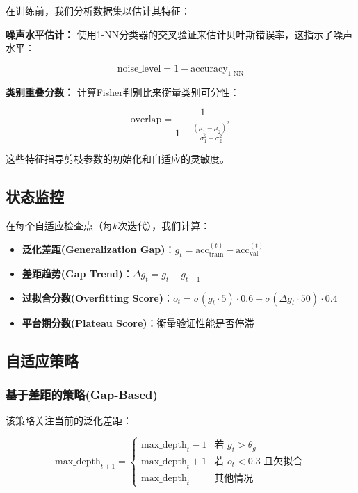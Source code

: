 \documentclass[12pt,a4paper]{article}
\begin{document}
在训练前，我们分析数据集以估计其特征：

\textbf{噪声水平估计：} 使用1-NN分类器的交叉验证来估计贝叶斯错误率，这指示了噪声水平：

\begin{equation}
\text{noise\_level} = 1 - \text{accuracy}_{1\text{-NN}}
\end{equation}

\textbf{类别重叠分数：} 计算Fisher判别比来衡量类别可分性：

\begin{equation}
\text{overlap} = \frac{1}{1 + \frac{(\mu_1 - \mu_2)^2}{\sigma_1^2 + \sigma_2^2}}
\end{equation}

这些特征指导剪枝参数的初始化和自适应的灵敏度。

\subsection{状态监控}

在每个自适应检查点（每$k$次迭代），我们计算：

\begin{itemize}[leftmargin=2em]
    \item \textbf{泛化差距(Generalization Gap)}：$g_t = \text{acc}_{\text{train}}^{(t)} - \text{acc}_{\text{val}}^{(t)}$
    \item \textbf{差距趋势(Gap Trend)}：$\Delta g_t = g_t - g_{t-1}$
    \item \textbf{过拟合分数(Overfitting Score)}：$o_t = \sigma(g_t \cdot 5) \cdot 0.6 + \sigma(\Delta g_t \cdot 50) \cdot 0.4$
    \item \textbf{平台期分数(Plateau Score)}：衡量验证性能是否停滞
\end{itemize}

\subsection{自适应策略}

\subsubsection{基于差距的策略(Gap-Based)}

该策略关注当前的泛化差距：

\begin{equation}
\text{max\_depth}_{t+1} = 
\begin{cases}
\text{max\_depth}_t - 1 & \text{若 } g_t > \theta_g \\
\text{max\_depth}_t + 1 & \text{若 } o_t < 0.3 \text{ 且欠拟合} \\
\text{max\_depth}_t & \text{其他情况}
\end{cases}
\end{equation}
\end{document}
